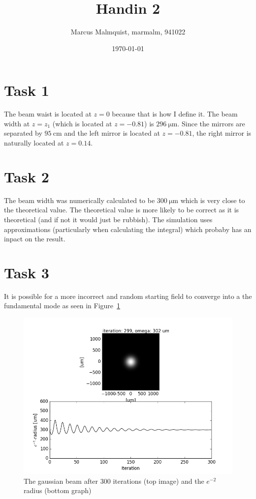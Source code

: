 \documentclass[12pt,a4paper]{article}
\title{Handin 2}
\author{Marcus Malmquist, marmalm, 941022}
\date{\today}
\begin{document}
\maketitle

\section{Task 1}\label{sec:1}
The beam waist is located at $z=0$ because that is how I define it. The beam width at $z=z_1$ (which is located at $z=-0.81$) is $\SI{296}{\micro\metre}$. Since the mirrors are separated by $\SI{95}{\centi\metre}$ and the left mirror is located at $z=-0.81$, the right mirror is naturally located at $z=0.14$.

\section{Task 2}\label{sec:2}
The beam width was numerically calculated to be $\SI{300}{\micro\metre}$ which is very close to the theoretical value. The theoretical value is more likely to be correct as it is theoretical (and if not it would just be rubbish). The simulation uses approximations (particularly when calculating the integral) which probaby has an inpact on the result.

\section{Task 3}\label{sec:3}
It is possible for a more incorrect and random starting field to converge into a the fundamental mode as seen in Figure~\ref{fig:task3}
\begin{figure}
  \centering
  \includegraphics[width=\textwidth]{3_gauss_0_0.png}
  \caption{The gaussian beam after 300 iterations (top image) and the $e^{-2}$ radius (bottom graph)}
  \label{fig:task3}
\end{figure}
\end{document}
